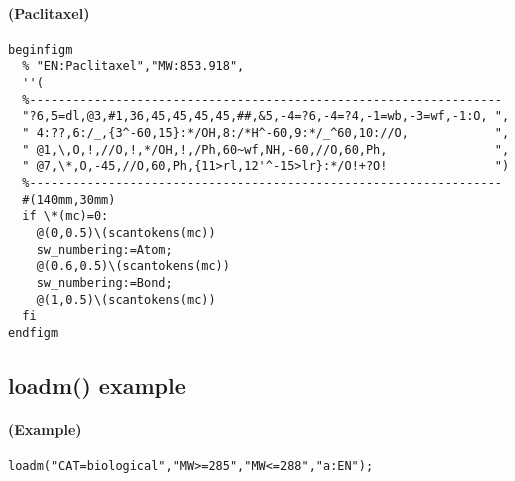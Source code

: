 \documentclass[a4paper]{article}
\begin{document}
\paragraph{(Paclitaxel)}
\noindent%
\begin{verbatim}
beginfigm
  % "EN:Paclitaxel","MW:853.918",
  ''(
  %------------------------------------------------------------------
  "?6,5=dl,@3,#1,36,45,45,45,45,##,&5,-4=?6,-4=?4,-1=wb,-3=wf,-1:O, ",
  " 4:??,6:/_,{3^-60,15}:*/OH,8:/*H^-60,9:*/_^60,10://O,            ",
  " @1,\,O,!,//O,!,*/OH,!,/Ph,60~wf,NH,-60,//O,60,Ph,               ",
  " @7,\*,O,-45,//O,60,Ph,{11>rl,12'^-15>lr}:*/O!+?O!               ")
  %------------------------------------------------------------------
  #(140mm,30mm)
  if \*(mc)=0:
    @(0,0.5)\(scantokens(mc))
    sw_numbering:=Atom;
    @(0.6,0.5)\(scantokens(mc))
    sw_numbering:=Bond;
    @(1,0.5)\(scantokens(mc))
  fi
endfigm
\end{verbatim}
\noindent%
\newpage
\subsection{loadm() example}
%
%
\paragraph{(Example)}
\begin{verbatim}
loadm("CAT=biological","MW>=285","MW<=288","a:EN");
\end{verbatim}
\end{document}
